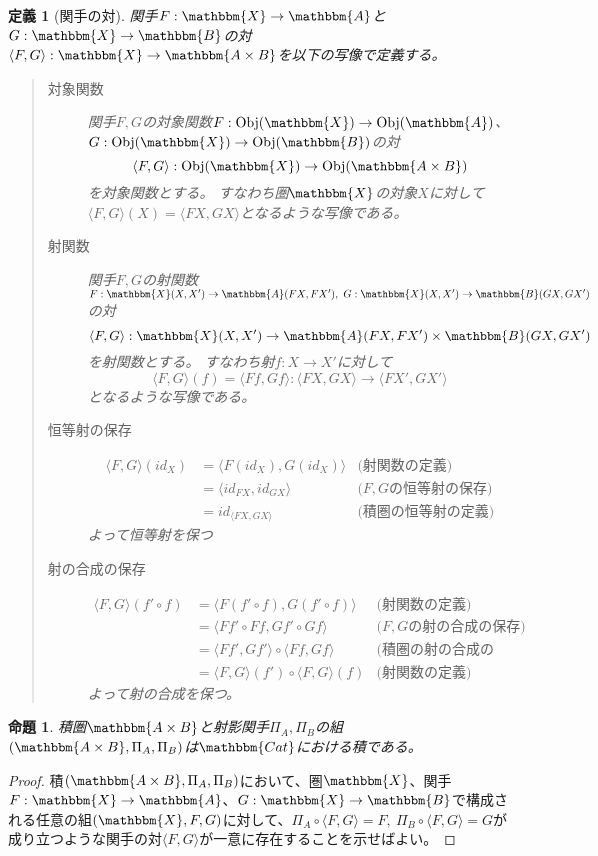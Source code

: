 \documentclass[dvipdfmx]{jsarticle}
\newcommand{\cat}[1]{\mathbbm{#1}}
\newcommand{\arrow}{\rightarrow}
\newcommand{\functor}[3]{#1:\cat{#2}\arrow \cat{#3}}
\newcommand{\tuple}[1]{\langle #1\rangle}
\newcommand{\obj}[1]{\mathrm{Obj}(\cat{#1})}
\newcommand{\mor}[3]{#1:#2\arrow #3}
\newcommand{\arset}[3]{\cat{#1}(#2,#3)}
\newtheorem{proof}{証明}[section]
\newtheorem{prop}{命題}[section]
\newtheorem{define}{定義}[section]
\numberwithin{proof}{subsection}
\numberwithin{prop}{subsection}
\numberwithin{define}{subsection}
\begin{document}
	\begin{define}[関手の対]
		関手$\functor{F}{X}{A}$と$\functor{G}{X}{B}$の対$\functor{\tuple{F,G}}{X}{A\times B}$を以下の写像で定義する。
		\begin{quote}
			\begin{description}
				\item[対象関数] 関手$F,G$の対象関数$\mor{F}{\obj{X}}{\obj{A}}$、$\mor{G}{\obj{X}}{\obj{B}}$の対\[\mor{\tuple{F,G}}{\obj{X}}{\obj{A\times B}}\]を対象関数とする。
				すなわち圏$\cat{X}$の対象$X$に対して$\tuple{F,G}(X)=\tuple{FX,GX}$となるような写像である。
				\item[射関数]
				関手$F,G$の射関数$\mor{F}{\arset{X}{X}{X'}}{\arset{A}{FX}{FX'}},\ \mor{G}{\arset{X}{X}{X'}}{\arset{B}{GX}{GX'}}$の対\[\mor{\tuple{F,G}}{\arset{X}{X}{X'}}{\arset{A}{FX}{FX'}\times\arset{B}{GX}{GX'}}\]を射関数とする。
				すなわち射$\mor{f}{X}{X'}$に対して\[\mor{\tuple{F,G}(f)=\tuple{Ff,Gf}}{\tuple{FX,GX}}{\tuple{FX',GX'}}\]となるような写像である。
				\item[恒等射の保存]
				\begin{align*}
					\tuple{F,G}(id_X)&=\tuple{F(id_X),G(id_X)}&\text{(射関数の定義)}\\
					&=\tuple{id_{FX},id_{GX}}&\text{($F,G$の恒等射の保存)}\\
					&=id_{\tuple{FX,GX}}&\text{(積圏の恒等射の定義)}
				\end{align*}
			よって恒等射を保つ
				\item[射の合成の保存]
				\begin{align*}
					\tuple{F,G}(f'\circ f)&=\tuple{F(f'\circ f),G(f'\circ f)}&\text{(射関数の定義)}\\
					&=\tuple{Ff'\circ Ff, Gf'\circ Gf}&\text{($F,G$の射の合成の保存)}\\
					&=\tuple{Ff',Gf'}\circ\tuple{Ff,Gf}&\text{(積圏の射の合成の定義)}\\
					&=\tuple{F,G}(f')\circ\tuple{F,G}(f)&\text{(射関数の定義)}
				\end{align*}
			よって射の合成を保つ。
			\end{description}
		\end{quote}
	\end{define}
	\begin{prop}
		積圏$\cat{A\times B}$と射影関手$\Pi_A,\Pi_B$の組$(\cat{A\times B},\Pi_A,\Pi_B)$は$\cat{Cat}$における積である。
	\end{prop}
	\begin{proof}
		積$(\cat{A\times B},\Pi_A,\Pi_B)$において、圏$\cat{X}$、関手$\functor{F}{X}{A}$、$\functor{G}{X}{B}$で構成される任意の組$(\cat{X},F,G)$に対して、$\Pi_A\circ\tuple{F,G}=F,\ \Pi_B\circ\tuple{F,G}=G$が成り立つような関手の対$\tuple{F,G}$が一意に存在することを示せばよい。
	\end{proof}
\end{document}

